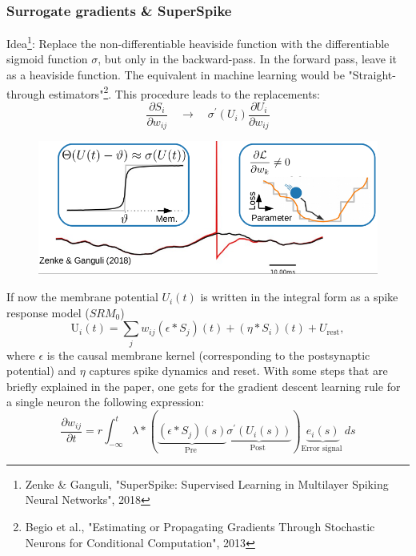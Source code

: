 \documentclass[main]{subfiles}
\begin{document}
\subsubsection{Surrogate gradients \& SuperSpike}
Idea\footnote{Zenke \& Ganguli, "SuperSpike: Supervised Learning in Multilayer Spiking Neural Networks", 2018}: Replace the non-differentiable heaviside function with the differentiable sigmoid function $\sigma$, but only in the backward-pass. In the forward pass, leave it as a heaviside function. The equivalent in machine learning would be "Straight-through estimators"\footnote{Begio et al., "Estimating or Propagating Gradients Through Stochastic Neurons for Conditional Computation", 2013}. This procedure leads to the replacements:
%
\begin{equation}
\frac{\partial S_{i}}{\partial w_{i j}} \quad \rightarrow \quad \sigma^{\prime}\left(U_{i}\right) \frac{\partial U_{i}}{\partial w_{i j}}
\end{equation}
%
\begin{figure}[H]
    \centering
    \includegraphics[width=0.8\linewidth]{10_DeepLearningWithSpikes/figures/surrogate_gradient.png}
    \caption{}
    \label{fig:my_label}
\end{figure}
%
If now the membrane potential $U_i(t)$ is written in the integral form as a spike response model ($SRM_0$)
%
\begin{equation}
\mathrm{U}_{i}(t)=\sum_{j} w_{i j}\left(\epsilon * S_{j}\right)(t)+\left(\eta * S_{i}\right)(t)+U_{\mathrm{rest}}, 
\end{equation}
%
where $\epsilon$ is the causal membrane kernel (corresponding to the postsynaptic potential) and $\eta$ captures spike dynamics and reset. With some steps that are briefly explained in the paper, one gets for the gradient descent learning rule for a single neuron the following expression:
%
\begin{equation}
\frac{\partial w_{i j}}{\partial t}=r \int_{-\infty}^{t}  \lambda *( \underbrace{\left(\epsilon * S_{j}\right)(s)}_{\text {Pre }} \underbrace{\sigma^{\prime}\left(U_{i}(s)\right)}_{\text {Post }}) \underbrace{e_{i}(s)}_{\text {Error signal }} ds
\end{equation}
\end{document}
